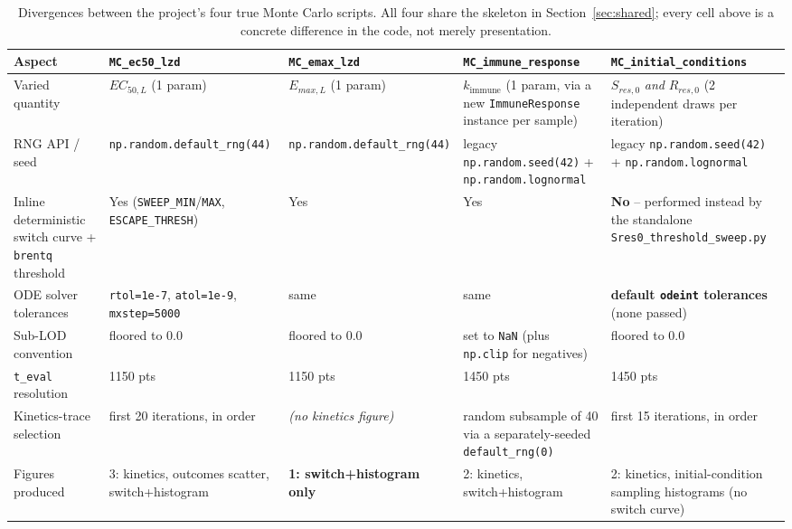 \documentclass[11pt]{article}
\begin{document}
\begin{table}[h]
\centering
\small
\begin{tabular}{@{}p{2.6cm}p{2.5cm}p{2.5cm}p{3.1cm}p{3.3cm}@{}}
\toprule
Aspect & \texttt{MC\_ec50\_lzd} & \texttt{MC\_emax\_lzd} & \texttt{MC\_immune\_response} & \texttt{MC\_initial\_conditions} \\
\midrule
Varied quantity &
$EC_{50,L}$ (1 param) &
$E_{max,L}$ (1 param) &
$k_{\mathrm{immune}}$ (1 param, via a new \texttt{ImmuneResponse} instance per sample) &
$S_{res,0}$ \emph{and} $R_{res,0}$ (2 independent draws per iteration) \\
\addlinespace
RNG API / seed &
\texttt{np.random.\allowbreak default\_rng(44)} &
\texttt{np.random.\allowbreak default\_rng(44)} &
legacy \texttt{np.random.\allowbreak seed(42)} + \texttt{np.random.\allowbreak lognormal} &
legacy \texttt{np.random.\allowbreak seed(42)} + \texttt{np.random.\allowbreak lognormal} \\
\addlinespace
Inline deterministic switch curve + \texttt{brentq} threshold &
Yes (\texttt{SWEEP\_MIN}/\texttt{MAX}, \texttt{ESCAPE\_THRESH}) &
Yes &
Yes &
\textbf{No} -- performed instead by the standalone \texttt{Sres0\_threshold\_sweep.py} \\
\addlinespace
ODE solver tolerances &
\texttt{rtol=1e-7}, \texttt{atol=1e-9}, \texttt{mxstep=5000} &
same &
same &
\textbf{default \texttt{odeint} tolerances} (none passed) \\
\addlinespace
Sub-LOD convention &
floored to $0.0$ &
floored to $0.0$ &
set to \texttt{NaN} (plus \texttt{np.clip} for negatives) &
floored to $0.0$ \\
\addlinespace
\texttt{t\_eval} resolution &
1150 pts &
1150 pts &
1450 pts &
1450 pts \\
\addlinespace
Kinetics-trace selection &
first 20 iterations, in order &
\emph{(no kinetics figure)} &
random subsample of 40 via a separately-seeded \texttt{default\_rng(0)} &
first 15 iterations, in order \\
\addlinespace
Figures produced &
3: kinetics, outcomes scatter, switch+histogram &
\textbf{1: switch+histogram only} &
2: kinetics, switch+histogram &
2: kinetics, initial-condition sampling histograms (no switch curve) \\
\bottomrule
\end{tabular}
\caption{Divergences between the project's four true Monte Carlo scripts. All four share the skeleton in Section~\ref{sec:shared}; every cell above is a concrete difference in the code, not merely presentation.}
\end{table}
\end{document}
